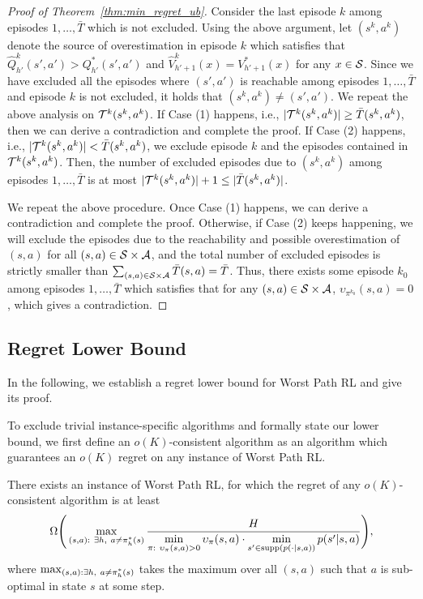 \begin{proof}[Proof of Theorem~\ref{thm:min_regret_ub}]
	Consider the last episode $k$ among episodes $1,\dots, \bar{T}$ which is not excluded. Using the above argument, let $(s^k,a^k)$ denote the source of overestimation in episode $k$ which satisfies that $\hat{Q}^{k}_{h'}(s',a') > Q^{*}_{h'}(s',a')$ and $\hat{V}^{k}_{h'+1}(x)=V^{*}_{h'+1}(x)$ for any $x \in \mathcal{S}$. Since we have excluded all the episodes where $(s',a')$ is reachable among episodes $1,\dots, \bar{T}$ and episode $k$ is not excluded, it holds that $(s^k,a^k) \neq (s',a')$. We repeat the above analysis on $\mathcal{T}^k(s^k,a^k)$. If Case (1) happens, i.e., $|\mathcal{T}^{k}(s^k,a^k)| \geq \bar{T}(s^k,a^k)$, then we can derive a contradiction and complete the proof. If Case (2) happens, i.e., $|\mathcal{T}^{k}(s^k,a^k)| < \bar{T}(s^k,a^k)$, we exclude episode $k$ and the episodes contained in $\mathcal{T}^{k}(s^k,a^k)$. Then, the number of excluded episodes due to $(s^k,a^k)$ among episodes $1,\dots, \bar{T}$ is at most $|\mathcal{T}^{k}(s^k,a^k)| + 1 \leq |\bar{T}(s^k,a^k)|$.
	
	We repeat the above procedure. Once Case (1) happens, we can derive a contradiction and complete the proof. Otherwise, if Case (2) keeps happening, we will exclude the episodes due to the reachability and possible overestimation of $(s,a)$ for all $(s,a) \in \mathcal{S} \times \mathcal{A}$, and the total number of excluded episodes is strictly smaller than $ \sum_{(s,a) \in \mathcal{S} \times \mathcal{A}} \bar{T}(s,a)=\bar{T}$. Thus, there exists some episode $k_0$ among episodes $1,\dots, \bar{T}$ which satisfies that for any $(s,a) \in \mathcal{S} \times \mathcal{A}$, $\upsilon_{\pi^{k_0}}(s,a)=0$, which gives a contradiction. 
\end{proof}


\subsection{Regret Lower Bound}\label{apx:worst_path_lb}

In the following, 
we establish a regret lower bound for Worst Path RL and give its proof.

To exclude trivial instance-specific algorithms and formally state our lower bound, we first define an $o(K)$-consistent algorithm as an algorithm which guarantees an $o(K)$ regret on any instance of Worst Path RL.

\begin{theorem} \label{thm:min_regret_lb}
	There exists an instance of Worst Path RL, for which the regret of any $o(K)$-consistent algorithm is at least
	\begin{align*}
		\Omega \Bigg( \max_{ (s,a):\  \exists h,\ a \neq \pi^{*}_h(s) } \frac{ H }{\min \limits_{ \pi:\   \upsilon_{\pi}(s,a)>0 } \upsilon_{\pi}(s,a) \cdot \min \limits_{s' \in \textup{supp}( p(\cdot|s,a))} p(s'|s,a) } \Bigg) ,
	\end{align*}
	where $\max_{\begin{subarray}{c} (s,a): \exists h,\ a \neq \pi^{*}_h(s) \end{subarray}}$ takes the maximum over all $(s,a)$ such that $a$ is sub-optimal in state $s$ at some step.
\end{theorem}

